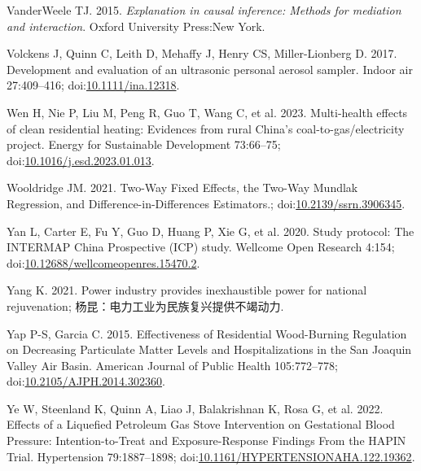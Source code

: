 \documentclass[
  letterpaper,
  DIV=11,
  numbers=noendperiod]{scrartcl}
\newlength{\cslhangindent}
\newlength{\cslentryspacingunit} %
\newenvironment{CSLReferences}[2] %
 {%
  \setlength{\parindent}{0pt}
  \ifodd #1
  \let\oldpar\par
  \def\par{\hangindent=\cslhangindent\oldpar}
  \fi
  \setlength{\parskip}{#2\cslentryspacingunit}
 }%
 {}
\begin{document}
\begin{CSLReferences}{1}{0}
\leavevmode{}%
VanderWeele TJ. 2015. \emph{Explanation in causal inference: Methods for
mediation and interaction}. Oxford University Press:New York.

\leavevmode{}%
Volckens J, Quinn C, Leith D, Mehaffy J, Henry CS, Miller-Lionberg D.
2017. Development and evaluation of an ultrasonic personal aerosol
sampler. Indoor air 27:409--416;
doi:\href{https://doi.org/10.1111/ina.12318}{10.1111/ina.12318}.

\leavevmode{}%
Wen H, Nie P, Liu M, Peng R, Guo T, Wang C, et al. 2023. Multi-health
effects of clean residential heating: {Evidences} from rural {China}'s
coal-to-gas/electricity project. Energy for Sustainable Development
73:66--75;
doi:\href{https://doi.org/10.1016/j.esd.2023.01.013}{10.1016/j.esd.2023.01.013}.

\leavevmode{}%
Wooldridge JM. 2021. Two-{Way Fixed Effects}, the {Two-Way Mundlak
Regression}, and {Difference-in-Differences Estimators}.;
doi:\href{https://doi.org/10.2139/ssrn.3906345}{10.2139/ssrn.3906345}.

\leavevmode{}%
Yan L, Carter E, Fu Y, Guo D, Huang P, Xie G, et al. 2020. Study
protocol: {The INTERMAP China Prospective} ({ICP}) study. Wellcome Open
Research 4:154;
doi:\href{https://doi.org/10.12688/wellcomeopenres.15470.2}{10.12688/wellcomeopenres.15470.2}.

\leavevmode{}%
Yang K. 2021. Power industry provides inexhaustible power for national
rejuvenation; 杨昆：电力工业为民族复兴提供不竭动力.

\leavevmode{}%
Yap P-S, Garcia C. 2015. Effectiveness of {Residential Wood-Burning
Regulation} on {Decreasing Particulate Matter Levels} and
{Hospitalizations} in the {San Joaquin Valley Air Basin}. American
Journal of Public Health 105:772--778;
doi:\href{https://doi.org/10.2105/AJPH.2014.302360}{10.2105/AJPH.2014.302360}.

\leavevmode{}%
Ye W, Steenland K, Quinn A, Liao J, Balakrishnan K, Rosa G, et al. 2022.
Effects of a {Liquefied Petroleum Gas Stove Intervention} on
{Gestational Blood Pressure}: {Intention-to-Treat} and
{Exposure-Response Findings From} the {HAPIN Trial}. Hypertension
79:1887--1898;
doi:\href{https://doi.org/10.1161/HYPERTENSIONAHA.122.19362}{10.1161/HYPERTENSIONAHA.122.19362}.


\end{CSLReferences}
\end{document}
